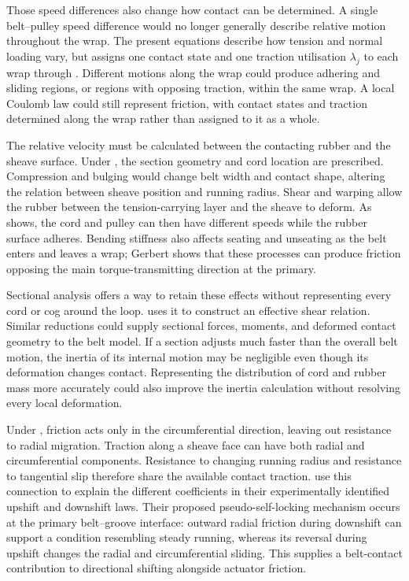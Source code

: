 \documentclass[11pt]{report}
\numberwithin{equation}{section}
\newcounter{assump}
\begin{document}
Those speed differences also change how contact can be determined. A single
belt--pulley speed difference would no longer generally describe relative
motion throughout the wrap. The present equations describe how tension and
normal loading vary, but  assigns one
contact state and one traction utilisation \(\lambda_j\) to each wrap through
. Different motions along the wrap could
produce adhering and sliding regions, or regions with opposing traction,
within the same wrap. A local Coulomb law could still represent friction, with
contact states and traction determined along the wrap rather than assigned to
it as a whole.

The relative velocity must be calculated between the contacting rubber and the
sheave surface. Under , the section
geometry and cord location are prescribed. Compression and bulging would
change belt width and contact shape, altering the relation between sheave
position and running radius. Shear and warping allow the rubber between the
tension-carrying layer and the sheave to deform. As \citet{Gerbert1996} shows,
the cord and pulley can then have different speeds while the rubber surface
adheres. Bending stiffness also affects seating and unseating as the belt
enters and leaves a wrap; Gerbert shows that these processes can produce
friction opposing the main torque-transmitting direction at the primary.

Sectional analysis offers a way to retain these effects without representing
every cord or cog around the loop. \citet{Gerbert1996} uses it to construct an
effective shear relation. Similar reductions could supply sectional forces,
moments, and deformed contact geometry to the belt model. If a section adjusts
much faster than the overall belt motion, the inertia of its internal motion
may be negligible even though its deformation changes contact. Representing
the distribution of cord and rubber mass more accurately could also improve
the inertia calculation without resolving every local deformation.

Under , friction acts only in the
circumferential direction, leaving out resistance to radial migration.
Traction along a sheave face can have both radial and circumferential
components. Resistance to changing running radius and resistance to tangential
slip therefore share the available contact traction.
\citet[p.~645]{KimEtAl2002} use this connection to explain the different
coefficients in their experimentally identified upshift and downshift laws.
Their proposed pseudo-self-locking mechanism occurs at the primary
belt--groove interface: outward radial friction during downshift can support a
condition resembling steady running, whereas its reversal during upshift
changes the radial and circumferential sliding. This supplies a belt-contact
contribution to directional shifting alongside actuator friction.
\end{document}
